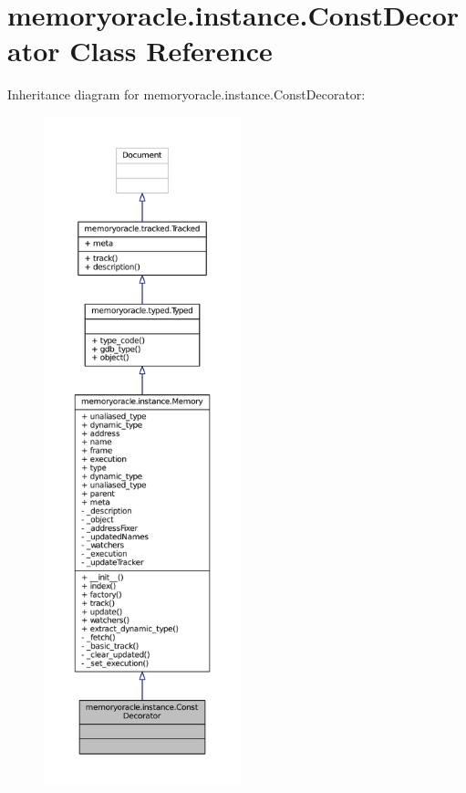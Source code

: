 \hypertarget{classmemoryoracle_1_1instance_1_1ConstDecorator}{}\section{memoryoracle.\+instance.\+Const\+Decorator Class Reference}
\label{classmemoryoracle_1_1instance_1_1ConstDecorator}


Inheritance diagram for memoryoracle.\+instance.\+Const\+Decorator\+:
\nopagebreak
\begin{figure}[H]
\begin{center}
\leavevmode
\includegraphics[height=550pt]{classmemoryoracle_1_1instance_1_1ConstDecorator__inherit__graph}
\end{center}
\end{figure}


